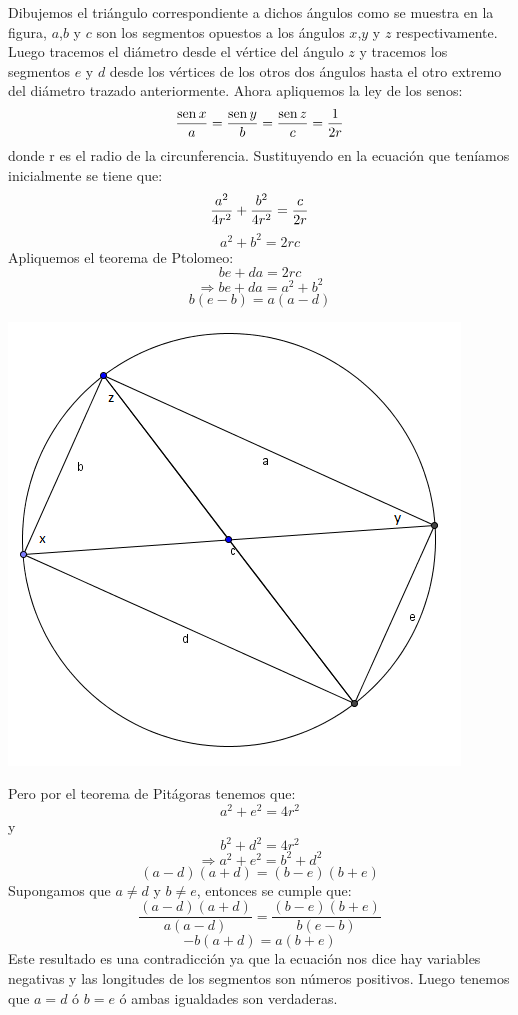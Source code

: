 \documentclass{book}
\newcommand{\sen}{\mathop{\rm sen}\nolimits} %
\begin{document}
\begin{enumerate}
        Dibujemos el triángulo correspondiente a dichos ángulos como se muestra en la figura, $a$,$b$ y $c$ son los segmentos opuestos a los ángulos $x$,$y$ y $z$ respectivamente. Luego tracemos el diámetro desde el vértice del ángulo $z$ y tracemos los segmentos $e$ y $d$ desde los vértices de los otros dos ángulos hasta el otro extremo del diámetro trazado anteriormente.
        Ahora apliquemos la ley de los senos:
        $${\sen {x}\over a}={\sen {y}\over b}={\sen {z}\over c}={1\over 2r}$$
        donde r es el radio de la circunferencia.
        Sustituyendo en la ecuación que teníamos inicialmente se tiene que:
        $${a^2\over 4r^2} +{b^2\over 4r^2} ={c\over 2r}$$
        $$a^2+b^2=2rc$$
        Apliquemos el teorema de Ptolomeo:
        $$be+da=2rc$$
        $$\Rightarrow be+da=a^2+b^2$$
        $$b(e-b)=a(a-d)$$
        \begin{center}
            \includegraphics[scale=1]{imagenes/Geometria/9.png}
        \end{center}
        Pero por el teorema de Pitágoras tenemos que:
        $$a^2+e^2=4r^2$$
        y
        $$b^2+d^2=4r^2$$
        $$\Rightarrow a^2+e^2=b^2+d^2$$
        $$(a-d)(a+d)=(b-e)(b+e)$$
        Supongamos que $a\neq d$ y $b\neq e$, entonces se cumple que:
        $$\frac{(a-d)(a+d)}{a(a-d)}=\frac{(b-e)(b+e)}{b(e-b)} $$
        $$-b(a+d)=a(b+e)$$
        Este resultado es una contradicción ya que la ecuación nos dice hay variables negativas y las longitudes de los segmentos son números positivos. Luego tenemos que $a=d$ ó $b=e$ ó ambas igualdades son verdaderas.\\

\end{enumerate}
\end{document}
